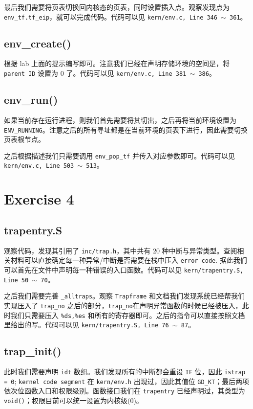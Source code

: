 \documentclass[11pt]{article}
\begin{document}
		最后我们需要将页表切换回内核态的页表，同时设置插入点。观察发现点为 \texttt{env\_tf.tf\_eip}，就可以完成代码。代码可以见  \texttt{kern/env.c, Line 346 $\sim$ 361}。
		
	\subsection*{env\_create()}
		根据 lab 上面的提示编写即可。注意我们已经在声明存储环境的空间是，将 \texttt{parent ID} 设置为 0 了。代码可以见  \texttt{kern/env.c, Line 381 $\sim$ 386}。
	
	\subsection*{env\_run()}
		如果当前存在运行进程，则我们首先需要将其切出，之后再将当前环境设置为 \texttt{ENV\_RUNNING}。注意之后的所有寻址都是在当前环境的页表下进行，因此需要切换页表根节点。
		
		之后根据描述我们只需要调用 \texttt{env\_pop\_tf} 并传入对应参数即可。代码可以见  \texttt{kern/env.c, Line 503 $\sim$ 513}。
		
	\section{Exercise 4}
		
		\subsection*{trapentry.S}
		
			观察代码，发现其引用了 \texttt{inc/trap.h}，其中共有 $20$ 种中断与异常类型。查阅相关材料可以直接确定每一种异常/中断是否需要在栈中压入 \texttt{error code}. 据此我们可以首先在文件中声明每一种错误的入口函数。代码可以见  \texttt{kern/trapentry.S, Line 50 $\sim$ 70}。
			
			
			之后我们需要完善 \texttt{\_alltraps}。观察 \texttt{Trapframe} 和文档我们发现系统已经帮我们实现压入了 \texttt{trap\_no} 之后的部分，\texttt{trap\_no}在声明异常函数的时候已经被压入，此时我们只需要压入 \texttt{\%ds,\%es} 和所有的寄存器即可。之后的指令可以直接按照文档里给出的写。代码可以见 \texttt{kern/trapentry.S, Line 76 $\sim$ 87}。
	
		\subsection*{trap\_init()}
			 此时我们需要声明 \texttt{idt} 数组。我们发现所有的中断都会重设 \texttt{IF} 位，因此 \texttt{istrap = 0}; \texttt{kernel code segment} 在 \texttt{kern/env.h} 出现过，因此其值位 \texttt{GD\_KT}；最后两项依次位函数入口和权限级别。函数接口我们在 \texttt{trapentry} 已经声明过，其类型为 \texttt{void()}；权限目前可以统一设置为内核级(0)。
			 
\end{document}
